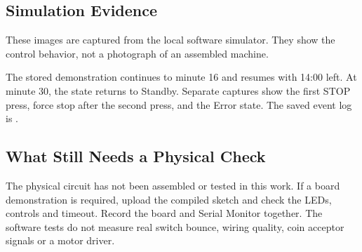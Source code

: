 \subsection{Simulation Evidence}
These images are captured from the local software simulator. They show the
control behavior, not a photograph of an assembled machine.


The stored demonstration continues to minute 16 and resumes with 14:00 left.
At minute 30, the state returns to Standby. Separate captures show the first
STOP press, force stop after the second press, and the Error state.
The saved event log is .

\subsection{What Still Needs a Physical Check}
The physical circuit has not been assembled or tested in this work. If a board
demonstration is required, upload the compiled sketch and check the LEDs,
controls and timeout. Record the board and Serial Monitor
together. The software tests do not measure real switch bounce, wiring quality,
coin acceptor signals or a motor driver.
